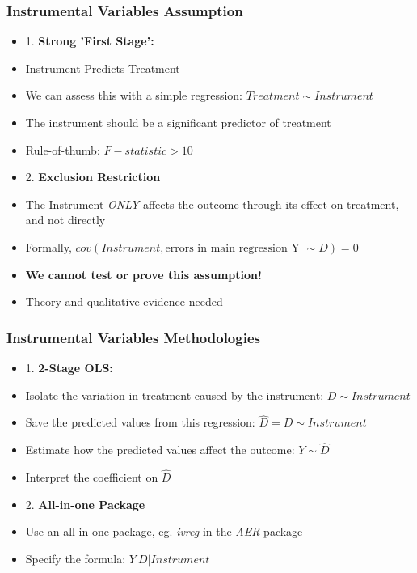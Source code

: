 \documentclass[xcolor=x11names,compress]{beamer}\usepackage[]{graphicx}\usepackage[]{color}
\renewcommand{\(}{\begin{columns}}
\renewcommand{\)}{\end{columns}}
\newcommand{\<}[1]{\begin{column}{#1}}
\renewcommand{\>}{\end{column}}
\begin{document}
\begin{frame}
\frametitle{Instrumental Variables Assumption}
\begin{multicols}{2}
\begin{itemize}
\item 1. \textbf{Strong 'First Stage':}
\pause
\item Instrument Predicts Treatment
\pause
\item We can assess this with a simple regression: $Treatment \sim Instrument$
\pause
\item The instrument should be a significant predictor of treatment
\item Rule-of-thumb: $F-statistic > 10$
\end{itemize}
\columnbreak
\begin{itemize}
\item 2. \textbf{Exclusion Restriction} 
\pause
\item The Instrument \textit{ONLY} affects the outcome through its effect on treatment, and not directly
\pause
\item Formally, $cov(Instrument,\text{errors in main regression Y }\sim D)=0$
\pause
\item \textbf{We cannot test or prove this assumption!}
\pause
\item Theory and qualitative evidence needed
\end{itemize}
\end{multicols}
\end{frame}

\begin{frame}
\frametitle{Instrumental Variables Methodologies}
\begin{multicols}{2}
\begin{itemize}
\item 1. \textbf{2-Stage OLS:}
\pause
\item Isolate the variation in treatment caused by the instrument: $D \sim Instrument$
\pause
\item Save the predicted values from this regression: $\hat{D} = D \sim Instrument$
\pause
\item Estimate how the predicted values affect the outcome: $Y \sim \hat{D}$
\pause
\item Interpret the coefficient on $\hat{D}$
\end{itemize}
\columnbreak
\begin{itemize}
\item 2. \textbf{All-in-one Package} 
\pause
\item Use an all-in-one package, eg. \textit{ivreg} in the \textit{AER} package
\pause
\item Specify the formula: $Y ~ D | Instrument$
\end{itemize}
\end{multicols}
\end{frame}
\end{document}
